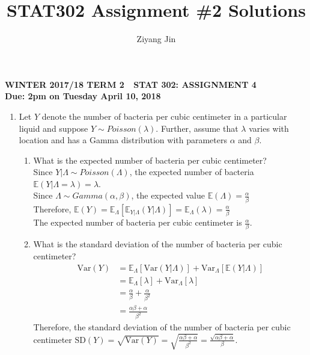 \documentclass[11pt]{article}
\title{STAT302 Assignment \#2 Solutions}
\author{Ziyang Jin}
\newcommand{\e}{\mathbb{E}}
\newcommand{\var}{\text{Var}}
\newcommand{\sd}{\text{SD}}
\begin{document}
\begin{center}
\textbf{WINTER 2017/18 TERM 2  \,\, STAT 302: ASSIGNMENT 4 \\
Due: 2pm on Tuesday April 10, 2018}
\end{center}


\begin{enumerate}[label=\textbf{Question \arabic*:},start=1]


\item
Let $Y$ denote the number of bacteria per cubic centimeter in a particular liquid and suppose $Y\sim Poisson(\lambda)$. Further, assume that $\lambda$ varies with location and has a Gamma distribution with parameters $\alpha$ and $\beta$.
\begin{enumerate}
	\item What is the expected number of bacteria per cubic centimeter?\\
	
	Since $Y|\Lambda \sim Poisson(\Lambda)$, the expected number of bacteria $\e{(Y|\Lambda = \lambda)} = \lambda$.\\
	Since $\Lambda \sim Gamma(\alpha, \beta)$, the expected value $\e{(\Lambda)} = \frac{\alpha}{\beta}$ \\
	Therefore, $\e(Y) = \e_{\Lambda}[\e_{Y|\Lambda}(Y|\Lambda)] = \e_{\Lambda}(\lambda) = \frac{\alpha}{\beta}$\\
	The expected number of bacteria per cubic centimeter is $\frac{\alpha}{\beta}$.\\

	\item What is the standard deviation of the number of bacteria per cubic centimeter?\\
	\begin{align*}
	\var(Y) & = \e_{\Lambda}[\var(Y|\Lambda)] + \var_{\Lambda}[\e(Y|\Lambda)] \\
	& = \e_{\Lambda}[\lambda] + \var_{\Lambda}[\lambda] \\
	& = \frac{\alpha}{\beta} + \frac{\alpha}{\beta^2} \\
	& = \frac{\alpha \beta + \alpha}{\beta^2}
	\end{align*}
	Therefore, the standard deviation of the number of bacteria per cubic centimeter $\sd(Y) = \sqrt{\var(Y)} = \sqrt{\frac{\alpha \beta + \alpha}{\beta^2}} = \frac{\sqrt{\alpha \beta + \alpha}}{\beta}$.\\


\end{enumerate}
\end{enumerate}
\end{document}
